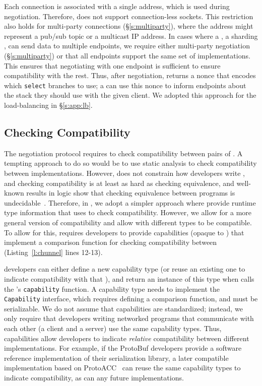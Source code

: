 Each \name connection is associated with a single address, which is used during negotiation.
Therefore, \name does not support connection-less sockets.
This restriction also holds for multi-party connections (\S\ref{s:multiparty}), where the address might represent a pub/sub topic or a multicast IP address.
In cases where a \tunnel, \eg a sharding \tunnel, can send data to multiple endpoints, we require either multi-party negotiation (\S\ref{s:multiparty}) or that all endpoints support the same set of \tunnel implementations.
This ensures that negotiating with one endpoint is sufficient to ensure compatibility with the rest.
Thus, after negotiation, \name returns a nonce that encodes which \texttt{select} branches to use;
a \tunnel can use this nonce to inform endpoints about the stack they should use with the given client.
We adopted this approach for the load-balancing \tunnel in \S\ref{s:app:lb}.



\subsection{Checking Compatibility}\label{s:check-compat}
The negotiation protocol requires \name to check compatibility between pairs of \tunnels. 
A tempting approach to do so would be to use static analysis to check compatibility between \tunnel implementations. However, \name does not constrain how developers write \tunnels, and checking compatibility is at least as hard as checking equivalence, and well-known results in logic show that checking equivalence between programs is undecidable~\cite{sipser13}. 
Therefore, in \name, we adopt a simpler approach where \tunnels provide runtime type information
that \name uses to check compatibility.
However, we allow for a more general version of compatibility and allow \tunnels with different types to be compatible.
To allow for this, \name requires developers to provide capabilities (opaque to \name) that implement a comparison function for checking compatibility between \tunnels (Listing~\ref{l:chunnel} lines 12-13). 

\tunnel developers can either define a new capability type (or reuse an existing one to indicate compatibility with that \tunnel), and return an instance of this type when \name calls the \tunnel's \texttt{capability} function. 
A capability type needs to implement the \texttt{Capability} interface, which requires defining a comparison function, and must be serializable. We do not assume that capabilities are standardized; instead, we only require that developers writing networked programs that communicate with each other (\eg a client and a server) use the same capability types.
Thus, capabilities allow \tunnel developers to indicate \emph{relative} compatibility between different implementations.
For example, if the ProtoBuf developers provide a software reference implementation of their serialization library, a later compatible implementation based on ProtoACC~\cite{protoacc} can reuse the same capability types to indicate compatibility, as can any future implementations.

